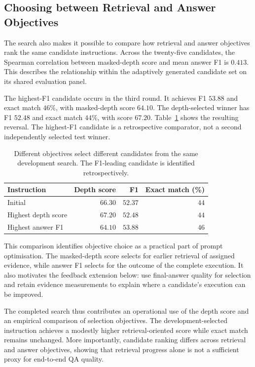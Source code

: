 \subsection{Choosing between Retrieval and Answer Objectives}

The search also makes it possible to compare how retrieval and answer
objectives rank the same candidate instructions. Across the twenty-five
candidates, the Spearman correlation between masked-depth score and mean
answer F1 is $0.413$. This describes the relationship within the adaptively
generated candidate set on its shared evaluation panel.

The highest-F1 candidate occurs in the third round. It achieves F1 $53.88$
and exact match $46\%$, with masked-depth score $64.10$. The depth-selected
winner has F1 $52.48$ and exact match $44\%$, with score $67.20$.
Table~\ref{tab:ch5-objectives} shows the resulting reversal. The highest-F1
candidate is a retrospective comparator, not a second independently selected
test winner.

\begin{table}[H]
\centering
\small
\caption{Different objectives select different candidates from the same
development search. The F1-leading candidate is identified retrospectively.}
\label{tab:ch5-objectives}
\begin{tabular}{lrrr}
\hline
Instruction & Depth score & F1 & Exact match (\%) \\
\hline
Initial & $66.30$ & $52.37$ & $44$ \\
Highest depth score & $67.20$ & $52.48$ & $44$ \\
Highest answer F1 & $64.10$ & $53.88$ & $46$ \\
\hline
\end{tabular}
\end{table}

This comparison identifies objective choice as a practical part of prompt
optimisation. The masked-depth score selects for earlier retrieval of
assigned evidence, while answer F1 selects for the outcome of the complete
execution. It also motivates the feedback extension below: use final-answer
quality for selection and retain evidence measurements to explain where a
candidate's execution can be improved.

The completed search thus contributes an operational use of the depth score
and an empirical comparison of selection objectives. The development-selected instruction achieves a modestly higher retrieval-oriented score while exact match remains unchanged. More importantly, candidate ranking differs across retrieval and answer objectives, showing that retrieval progress alone is not a sufficient proxy for end-to-end QA quality.

